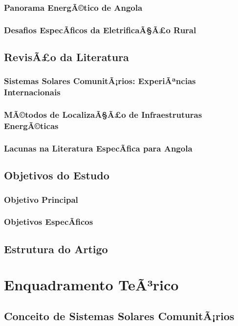 \documentclass[12pt, a4paper]{article}
\begin{document}
\subsubsection{Panorama EnergÃ©tico de Angola}
\subsubsection{Desafios EspecÃ­ficos da EletrificaÃ§Ã£o Rural}

\subsection{RevisÃ£o da Literatura}
\subsubsection{Sistemas Solares ComunitÃ¡rios: ExperiÃªncias Internacionais}
\subsubsection{MÃ©todos de LocalizaÃ§Ã£o de Infraestruturas EnergÃ©ticas}
\subsubsection{Lacunas na Literatura EspecÃ­fica para Angola}

\subsection{Objetivos do Estudo}
\subsubsection{Objetivo Principal}
\subsubsection{Objetivos EspecÃ­ficos}

\subsection{Estrutura do Artigo}

\section{Enquadramento TeÃ³rico}
\subsection{Conceito de Sistemas Solares ComunitÃ¡rios}
\end{document}
